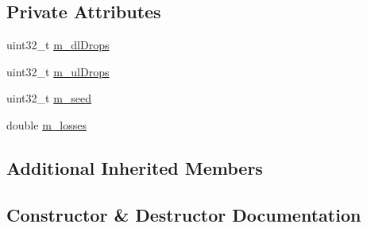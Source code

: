 \subsection*{Private Attributes}
\begin{DoxyCompactItemize}
\item 
uint32\+\_\+t \hyperlink{classLteRlcUmE2eTestCase_a11acb19c786aa57d6ce8bdf86e75d79f}{m\+\_\+dl\+Drops}
\item 
uint32\+\_\+t \hyperlink{classLteRlcUmE2eTestCase_aba1374edf326035c3804c471cbb844a0}{m\+\_\+ul\+Drops}
\item 
uint32\+\_\+t \hyperlink{classLteRlcUmE2eTestCase_a4efdc34bf54ce1409c1176bdb5ee5d08}{m\+\_\+seed}
\item 
double \hyperlink{classLteRlcUmE2eTestCase_a1d6de8677532b47d1b7fd61d2081bb30}{m\+\_\+losses}
\end{DoxyCompactItemize}
\subsection*{Additional Inherited Members}


\subsection{Constructor \& Destructor Documentation}
